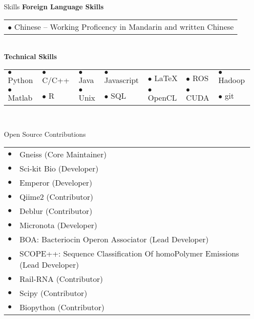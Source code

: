 \documentclass{resume} %
\begin{document}
\begin{rSection}{Skills}
  \textbf{Foreign Language Skills}\\[1 mm]
  \begin{tabular}{l}
    $\bullet$ Chinese --  Working Proficency in Mandarin and written Chinese\\
  \end{tabular}\\
  \textbf{Technical Skills}\\[1 mm]
  \begin{tabular}{lllllll}
     $\bullet$ Python   &  $\bullet$ C/C++ &  $\bullet$ Java  & $\bullet$ Javascript &  $\bullet$ \LaTeX   &  $\bullet$ ROS    &  $\bullet$ Hadoop\\
     $\bullet$ Matlab   &  $\bullet$ R     &  $\bullet$ Unix   & $\bullet$ SQL      &  $\bullet$ OpenCL   &  $\bullet$ CUDA   &   $\bullet$ git\\
  \end{tabular}\\[1 mm]
\end{rSection}
\begin{rSection}{Open Source Contributions}
  \begin{tabular}{ll}
      $\bullet$ & Gneiss (Core Maintainer)\\
      $\bullet$ & Sci-kit Bio (Developer)\\
      $\bullet$ & Emperor (Developer)\\
      $\bullet$ & Qiime2 (Contributor)\\
      $\bullet$ & Deblur (Contributor)\\
      $\bullet$ & Micronota (Developer)\\
      $\bullet$ & BOA: Bacteriocin Operon Associator (Lead Developer)\\
      $\bullet$ & SCOPE++: Sequence Classification Of homoPolymer Emissions (Lead Developer)\\
      $\bullet$ & Rail-RNA (Contributor)\\
      $\bullet$ & Scipy (Contributor)\\
      $\bullet$ & Biopython (Contributor)\\
  \end{tabular}
\end{rSection}

\end{document}
